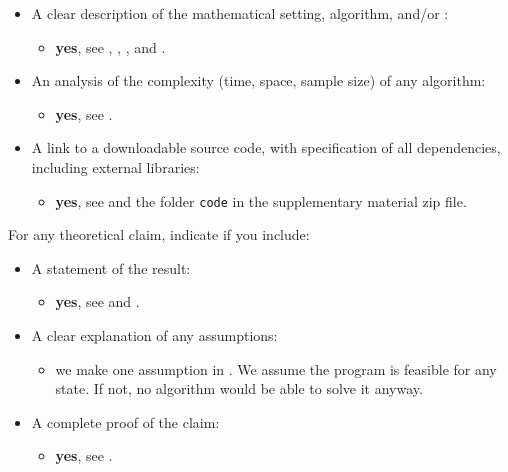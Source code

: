 \begin{itemize}
    \item  A clear description of the mathematical setting, algorithm, and/or :

    \begin{itemize}
        \item \textbf{yes}, see , , ,
        and .
    \end{itemize}
    \item An analysis of the complexity (time, space, sample size) of any algorithm:
    \begin{itemize}
        \item \textbf{yes}, see .
    \end{itemize}
    \item A link to a downloadable source code, with specification of all dependencies, including external libraries:
    \begin{itemize}
        \item \textbf{yes}, see  and the folder \texttt{code} in the supplementary material zip file.
    \end{itemize}
\end{itemize}

For any theoretical claim, indicate if you include:

\begin{itemize}
    \item  A statement of the result:
    \begin{itemize}
        \item  \textbf{yes}, see  and .
    \end{itemize}
    \item A clear explanation of any assumptions:
    \begin{itemize}
        \item  we make one assumption in . We assume the program is feasible for any state. If not, no algorithm would be able to solve it anyway.
    \end{itemize}
    \item A complete proof of the claim:
    \begin{itemize}
        \item  \textbf{yes}, see .
    \end{itemize}
\end{itemize}

